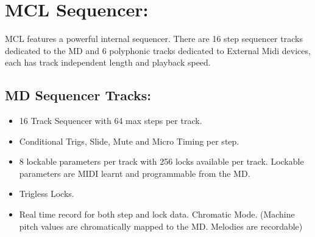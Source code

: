 \chapter{MCL Sequencer:}
MCL features a powerful internal sequencer. There are 16 step sequencer tracks dedicated to the MD and 6 polyphonic tracks dedicated to External Midi devices, each has track independent length and playback speed.
\section{MD Sequencer Tracks:}
\begin{itemize}
\item 16 Track Sequencer with 64 max steps per track.
\item Conditional Trigs, Slide, Mute and Micro Timing per step.
\item 8 lockable parameters per track with 256 locks available per track. Lockable parameters are MIDI learnt and programmable from the MD.
\item Trigless Locks.
\item Real time record for both step and lock data.
Chromatic Mode. (Machine pitch values are chromatically mapped to the MD. Melodies are recordable)
\end{itemize}
